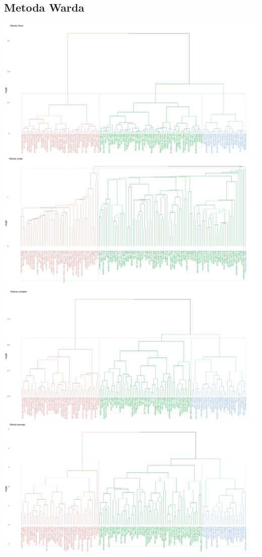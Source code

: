 \documentclass{article}
\begin{document}
    \subsection{Metoda Warda}
        \includegraphics[width = \textwidth]{ward_fig}
        \includegraphics[width = \textwidth]{single_fig.jpeg}
        \includegraphics[width = \textwidth]{complete_fig.jpeg}
        \includegraphics[width = \textwidth]{average_fig.jpeg}
\end{document}
